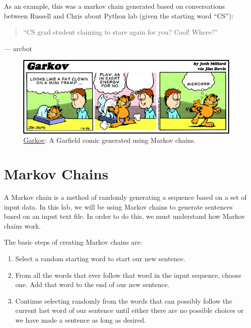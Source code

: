 \documentclass[11pt]{cselabheader}
\begin{document}
As an example, this was a markov chain generated based on conversations between
Russell and Chris about Python lab (given the starting word ``CS''):
\begin{quotation}
``CS grad student claiming to stare again for you? Cool! Where?''
\end{quotation}
\begin{flushright}
--- arcbot
\end{flushright}


\begin{figure}[!ht]
  \centering
  \includegraphics[width=\linewidth]{img/garkov}
  \caption*{\href{http://joshmillard.com/garkov/}{Garkov}:
    A Garfield comic generated using Markov chains.}
  \label{garkov}
\end{figure}

\pagebreak

\section{Markov Chains}
\label{sec:markov}

A Markov chain is a method of randomly generating a sequence based on a set of
input data. In this lab, we will be using Markov chains to generate sentences
based on an input text file. In order to do this, we must understand how Markov
chains work.

The basic steps of creating Markov chains are:
\begin{enumerate}
  \item Select a random starting word to start our new sentence.
  \item From all the words that ever follow that word in the input sequence,
    choose one. Add that word to the end of our new sentence.
  \item Continue selecting randomly from the words that can possibly follow the
    current last word of our sentence until either there are no possible choices
    or we have made a sentence as long as desired.
\end{enumerate}
\end{document}
